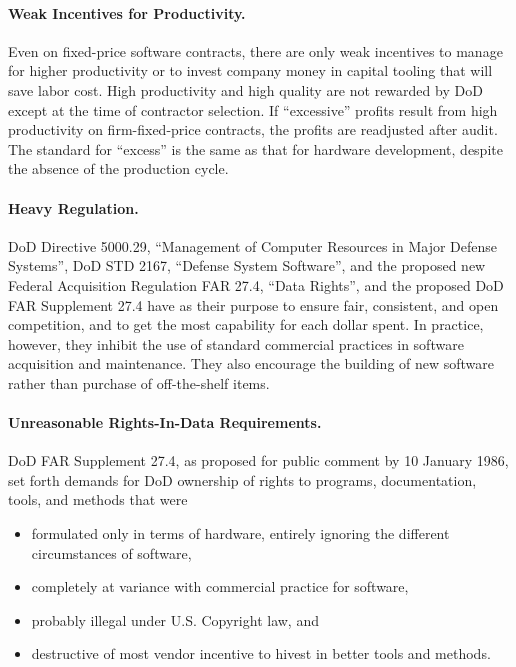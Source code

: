\documentclass[12pt,final]{article}
\begin{document}
\paragraph{Weak Incentives for Productivity.}  Even on fixed-price software
contracts, there are only weak incentives to manage for higher productivity or
to invest company money in capital tooling that will save labor cost. High
productivity and high quality are not rewarded by DoD except at the time of
contractor selection. If “excessive” profits result from high productivity on
firm-fixed-price contracts, the profits are readjusted after audit. The
standard for “excess” is the same as that for hardware development, despite the
absence of the production cycle.

\paragraph{Heavy Regulation.} DoD Directive 5000.29, “Management of Computer
Resources in Major Defense Systems”, DoD STD 2167, “Defense System Software”,
and the proposed new Federal Acquisition Regulation FAR 27.4, “Data Rights”,
and the proposed DoD FAR Supplement 27.4 have as their purpose to ensure fair,
consistent, and open competition, and to get the most capability for each
dollar spent. In practice, however, they inhibit the use of standard commercial
practices in software acquisition and maintenance. They also encourage the
building of new software rather than purchase of off-the-shelf items.

\paragraph{Unreasonable Rights-In-Data Requirements.}  DoD FAR Supplement 27.4,
as proposed for public comment by 10 January 1986, set forth demands for DoD
ownership of rights to programs, documentation, tools, and methods that were

\begin{itemize}
    \item formulated only in terms of hardware, entirely ignoring the different circumstances of software,
    \item completely at variance with commercial practice for software,
    \item probably illegal under U.S. Copyright law, and
    \item destructive of most vendor incentive to hivest in better tools and methods.
\end{itemize}
\end{document}
